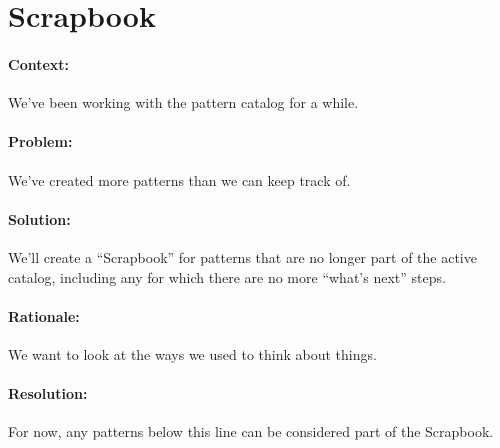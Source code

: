 \section{Scrapbook}

\paragraph{Context:} We've been working with the pattern catalog for a while.
\paragraph{Problem:} We've created more patterns than we can keep track of.
\paragraph{Solution:} We'll create a ``Scrapbook'' for patterns that are no longer part of the active catalog, including any for which there are no more ``what's next'' steps.
\paragraph{Rationale:} We want to look at the ways we used to think about things.
\paragraph{Resolution:} For now, any patterns below this line can be considered part of the Scrapbook.
